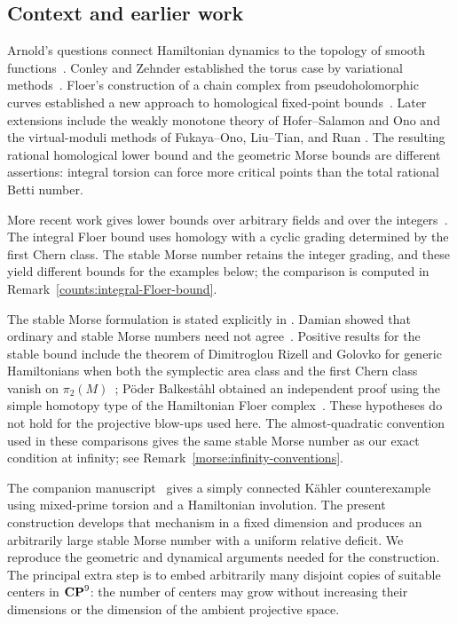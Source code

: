 \subsection*{Context and earlier work}
Arnold's questions connect Hamiltonian dynamics to the topology of smooth
functions~\cite{Arnold1986}. Conley and Zehnder established the torus case by
variational methods~\cite{ConleyZehnder1983}. Floer's construction of a
chain complex from pseudoholomorphic curves established a new approach to
homological fixed-point bounds~\cite{Floer1989}. Later extensions include the
weakly monotone theory of Hofer--Salamon and Ono and the virtual-moduli
methods of Fukaya--Ono, Liu--Tian, and Ruan
\cite{HoferSalamon1995,Ono1995,FukayaOno1999,LiuTian1998,Ruan1999}.
The resulting rational homological lower bound and the geometric Morse
bounds are different assertions: integral torsion can force more critical
points than the total rational Betti number.

More recent work gives lower bounds over arbitrary fields and over the
integers~\cite{AbouzaidBlumberg2021,BaiXu2022,BaiXu2026}. The integral
Floer bound uses homology with a cyclic grading determined by the first
Chern class. The stable Morse number retains the integer grading, and
these yield different bounds for the examples below; the comparison is
computed in Remark~\ref{counts:integral-Floer-bound}.

The stable Morse formulation is stated explicitly in
\cite[Conjecture~1.2]{Golovko2020}. Damian showed that ordinary and stable
Morse numbers need not agree~\cite{Damian2002}. Positive results for the
stable bound include the theorem of Dimitroglou Rizell and Golovko for
generic Hamiltonians when
both the symplectic area class and the first Chern class vanish on
$\pi_2(M)$~\cite[Corollary~1.4]{DRG2017}; P\"oder Balkest\aa hl obtained an
independent proof using the simple homotopy type of the Hamiltonian Floer
complex~\cite[Corollary~1.2]{PoderBalkestahl2021}. These hypotheses do not
hold for the projective blow-ups used here.
The almost-quadratic convention used in these comparisons gives the same
stable Morse number as our exact condition at infinity; see
Remark~\ref{morse:infinity-conventions}.

The companion manuscript~\cite{OpenAICompanion} gives a simply connected
Kähler counterexample using mixed-prime torsion and a Hamiltonian
involution. The present construction develops that mechanism in a fixed
dimension and produces an arbitrarily large stable Morse number with a
uniform relative deficit. We reproduce the geometric and dynamical
arguments needed for the construction. The principal extra step is to
embed arbitrarily many disjoint copies of suitable centers in $\mathbf{CP}^9$:
the number of centers may grow without increasing their dimensions or the
dimension of the ambient projective space.

